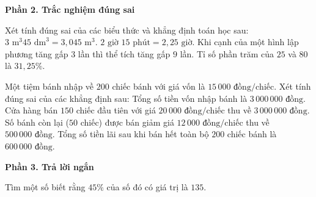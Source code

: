 \textbf{Phần 2. Trắc nghiệm đúng sai}

\begin{ex} %
Xét tính đúng sai của các biểu thức và khẳng định toán học sau:
\choiceTF
{\True $3\text{ m}^3 45\text{ dm}^3 = 3{,}045\text{ m}^3$.}
{\True $2\text{ giờ } 15\text{ phút} = 2{,}25\text{ giờ}$.}
{Khi cạnh của một hình lập phương tăng gấp $3$ lần thì thể tích tăng gấp $9$ lần.}
{\True Tỉ số phần trăm của $25$ và $80$ là $31{,}25\%$.}
\end{ex}

\begin{ex} %
Một tiệm bánh nhập về $200$ chiếc bánh với giá vốn là $15\,000\text{ đồng/chiếc}$. Xét tính đúng sai của các khẳng định sau:
\choiceTF
{\True Tổng số tiền vốn nhập bánh là $3\,000\,000\text{ đồng}$.}
{\True Cửa hàng bán $150$ chiếc đầu tiên với giá $20\,000\text{ đồng/chiếc}$ thu về $3\,000\,000\text{ đồng}$.}
{Số bánh còn lại ($50$ chiếc) được bán giảm giá $12\,000\text{ đồng/chiếc}$ thu về $500\,000\text{ đồng}$.}
{\True Tổng số tiền lãi sau khi bán hết toàn bộ $200$ chiếc bánh là $600\,000\text{ đồng}$.}
\end{ex}

\textbf{Phần 3. Trả lời ngắn}

\begin{ex} %
Tìm một số biết rằng $45\%$ của số đó có giá trị là $135$.
\end{ex}

